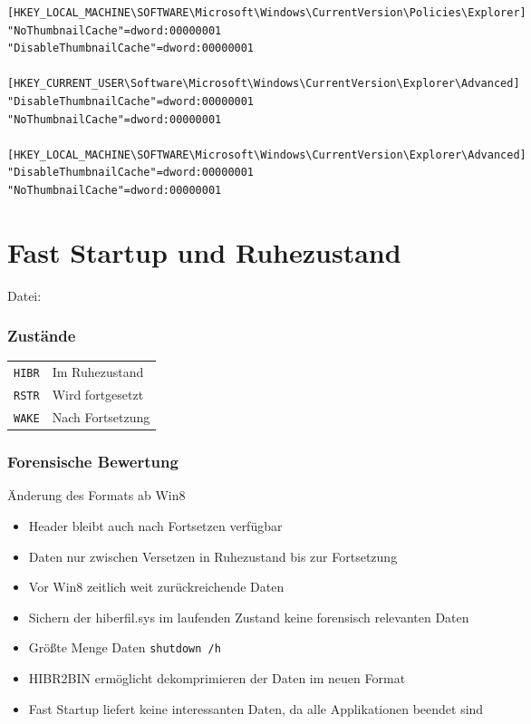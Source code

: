 \begin{multicols}{3}
\begin{lstlisting}
[HKEY_LOCAL_MACHINE\SOFTWARE\Microsoft\Windows\CurrentVersion\Policies\Explorer]
"NoThumbnailCache"=dword:00000001
"DisableThumbnailCache"=dword:00000001

[HKEY_CURRENT_USER\Software\Microsoft\Windows\CurrentVersion\Explorer\Advanced]
"DisableThumbnailCache"=dword:00000001
"NoThumbnailCache"=dword:00000001

[HKEY_LOCAL_MACHINE\SOFTWARE\Microsoft\Windows\CurrentVersion\Explorer\Advanced]
"DisableThumbnailCache"=dword:00000001
"NoThumbnailCache"=dword:00000001
\end{lstlisting}

\section{Fast Startup und Ruhezustand}
Datei: 
\subsubsection{Zustände}
\begin{tabular}{@{}p{\the\MyLen}%
		@{}p{\linewidth-\the\MyLen}@{}}
	\texttt{HIBR} & Im Ruhezustand\\
	\texttt{RSTR} & Wird fortgesetzt\\
	\texttt{WAKE} & Nach Fortsetzung\\
\end{tabular}

\subsubsection{Forensische Bewertung}
Änderung des Formats ab Win8
\begin{itemize}[leftmargin=*]
	\item Header bleibt auch nach Fortsetzen verfügbar
	\item Daten nur zwischen Versetzen in Ruhezustand bis zur Fortsetzung
	\item Vor Win8 zeitlich weit zurückreichende Daten
	\item Sichern der hiberfil.sys im laufenden Zustand keine forensisch relevanten Daten
	\item Größte Menge Daten \texttt{shutdown /h}
	\item HIBR2BIN ermöglicht dekomprimieren der Daten im neuen Format
	\item Fast Startup liefert keine interessanten Daten, da alle Applikationen beendet sind
\end{itemize}


\end{multicols}
